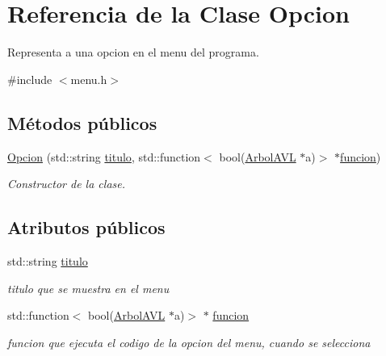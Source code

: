\hypertarget{classOpcion}{}\section{Referencia de la Clase Opcion}
\label{classOpcion}


Representa a una opcion en el menu del programa.  




{\ttfamily \#include $<$menu.\+h$>$}

\subsection*{Métodos públicos}
\begin{DoxyCompactItemize}
\item 
\hyperlink{classOpcion_aca1ec1590d4a27e91615ec8af53d2824}{Opcion} (std\+::string \hyperlink{classOpcion_a1d02b7f92549a27f96d434111ede0056}{titulo}, std\+::function$<$ bool(\hyperlink{classArbolAVL}{Arbol\+A\+VL} $\ast$a)$>$ $\ast$\hyperlink{classOpcion_a11149c2d9df3732dfb83727f9df76f05}{funcion})
\begin{DoxyCompactList}\small\item\em Constructor de la clase. \end{DoxyCompactList}\end{DoxyCompactItemize}
\subsection*{Atributos públicos}
\begin{DoxyCompactItemize}
\item 
\mbox{\label{classOpcion_a1d02b7f92549a27f96d434111ede0056}} 
std\+::string \hyperlink{classOpcion_a1d02b7f92549a27f96d434111ede0056}{titulo}
\begin{DoxyCompactList}\small\item\em titulo que se muestra en el menu \end{DoxyCompactList}\item 
\mbox{\label{classOpcion_a11149c2d9df3732dfb83727f9df76f05}} 
std\+::function$<$ bool(\hyperlink{classArbolAVL}{Arbol\+A\+VL} $\ast$a)$>$ $\ast$ \hyperlink{classOpcion_a11149c2d9df3732dfb83727f9df76f05}{funcion}
\begin{DoxyCompactList}\small\item\em funcion que ejecuta el codigo de la opcion del menu, cuando se selecciona \end{DoxyCompactList}\end{DoxyCompactItemize}


